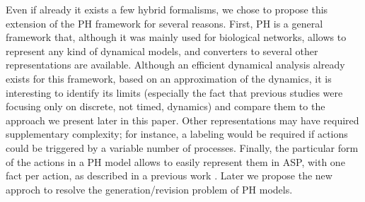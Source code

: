 Even if already it exists a few hybrid formalisms, we chose to propose this extension of the PH framework for several reasons.
First, PH is a general framework that,
although it was mainly used for biological networks,
allows to represent any kind of dynamical models,
and converters to several other representations are available.
Although an efficient dynamical analysis already exists for this framework,
based on an approximation of the dynamics,
it is interesting to identify its limits (especially the fact that previous studies were focusing only on discrete, not timed, dynamics)
and compare them to the approach we present later in this paper. Other representations may have required supplementary complexity;
for instance, a labeling would be required
if actions could be triggered by a variable number of processes.
Finally, the particular form of the actions in a  PH model allows
to easily represent them in ASP,
with one fact per action, as described in a previous work \cite{benabdallah2015}. Later we propose the new approch to resolve the generation/revision problem of PH models.


